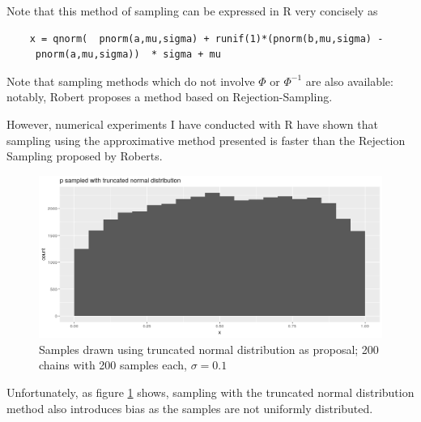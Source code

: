 Note that this method of sampling can be expressed in R very concisely as 
\begin{verbatim}
	x = qnorm(  pnorm(a,mu,sigma) + runif(1)*(pnorm(b,mu,sigma) -
	 pnorm(a,mu,sigma))  * sigma + mu
\end{verbatim}

Note that sampling methods which do not involve $\Phi$ or $\Phi^{-1}$ are also available: notably, Robert\cite{Robert95simulationof} proposes a method based on Rejection-Sampling.
\vspace{0.5cm}


However, numerical experiments I have conducted with R have shown that sampling using the approximative method presented is faster than the Rejection Sampling proposed by Roberts. 


\begin{figure}
	\includegraphics[width=\linewidth]{img/truncatedNormalAlsoBiased.png}
	\caption{Samples drawn using truncated normal distribution as proposal; 200 chains with 200 samples each, $\sigma = 0.1$}
	\label{fig:truncatedAlsoBiased}
\end{figure}
 
 Unfortunately, as figure \ref{fig:truncatedAlsoBiased} shows, sampling with the truncated normal distribution method also introduces bias as the samples are not uniformly distributed. 


